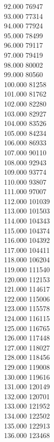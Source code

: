 { 92.000	76947 \\
 93.000	77314 \\
 94.000	77924 \\
 95.000	78499 \\
 96.000	79117 \\
 97.000	79419 \\
 98.000	80002 \\
 99.000	80560 \\
 100.000	81258 \\
 101.000	81762 \\
 102.000	82280 \\
 103.000	82927 \\
 104.000	83526 \\
 105.000	84234 \\
 106.000	86933 \\
 107.000	90110 \\
 108.000	92943 \\
 109.000	93774 \\
 110.000	93807 \\
 111.000	97007 \\
 112.000	101039 \\
 113.000	101503 \\
 114.000	104343 \\
 115.000	104374 \\
 116.000	104392 \\
 117.000	104411 \\
 118.000	106204 \\
 119.000	111540 \\
 120.000	112153 \\
 121.000	114617 \\
 122.000	115006 \\
 123.000	115578 \\
 124.000	116115 \\
 125.000	116765 \\
 126.000	117448 \\
 127.000	118027 \\
 128.000	118456 \\
 129.000	119008 \\
 130.000	119616 \\
 131.000	120149 \\
 132.000	120701 \\
 133.000	121952 \\
 134.000	122502 \\
 135.000	122913 \\
 136.000	123468 \\
}
